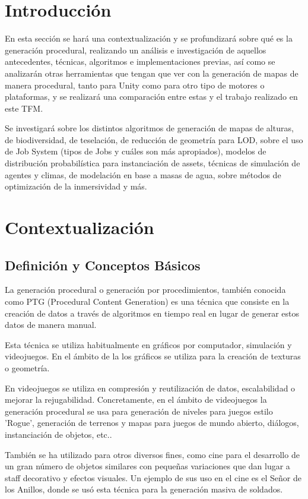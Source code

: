 \section{Introducción}
En esta sección se hará una contextualización y se profundizará sobre qué es la generación procedural, realizando un análisis e investigación de aquellos antecedentes, técnicas, algoritmos e implementaciones previas, así como se analizarán otras herramientas que tengan que ver con la generación de mapas de manera procedural, tanto para Unity como para otro tipo de motores o plataformas, y se realizará una comparación entre estas y el trabajo realizado en este TFM.

Se investigará sobre los distintos algoritmos de generación de mapas de alturas, de biodiversidad, de teselación, de reducción de geometría para LOD, sobre el uso de Job System (tipos de Jobs y cuáles son más apropiados), modelos de distribución probabilística para instanciación de assets, técnicas de simulación de agentes y climas, de modelación en base a masas de agua, sobre métodos de optimización de la inmersividad y más.

\section{Contextualización}
    \subsection{Definición y Conceptos Básicos}
    
    La generación procedural o generación por procedimientos, también conocida como PTG (Procedural Content Generation) es una técnica que consiste en la creación de datos a través de algoritmos en tiempo real en lugar de generar estos datos de manera manual.
    
    Esta técnica se utiliza habitualmente en gráficos por computador, simulación y videojuegos. En el ámbito de la los gráficos se utiliza para la creación de texturas o geometría.
    
    En videojuegos se utiliza en compresión y reutilización de datos, escalabilidad o mejorar la rejugabilidad. Concretamente, en el ámbito de videojuegos la generación procedural se usa para generación de niveles para juegos estilo 'Rogue', generación de terrenos y mapas para juegos de mundo abierto, diálogos, instanciación de objetos, etc.\cite{procedural-generation-overview}.

    También se ha utilizado para otros diversos fines, como cine para el desarrollo de un gran número de objetos similares con pequeñas variaciones que dan lugar a staff decorativo y efectos visuales. Un ejemplo de sus uso en el cine es el Señor de los Anillos, donde se usó esta técnica para la generación masiva de soldados. \cite{generacion-procedimental-wikipedia}

